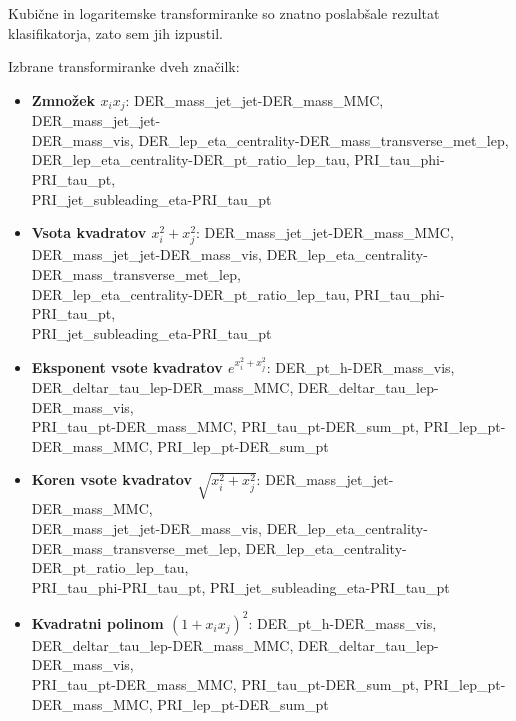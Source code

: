 \documentclass[11pt,a4paper,openany]{book}
\begin{document}
Kubične in logaritemske transformiranke so znatno poslabšale rezultat klasifikatorja, zato sem jih izpustil.

Izbrane transformiranke dveh značilk:
\begin{itemize}
	\item \textbf{Zmnožek $x_ix_j$}: DER\_mass\_jet\_jet-DER\_mass\_MMC, DER\_mass\_jet\_jet- \\ DER\_mass\_vis, DER\_lep\_eta\_centrality-DER\_mass\_transverse\_met\_lep, \\ DER\_lep\_eta\_centrality-DER\_pt\_ratio\_lep\_tau, PRI\_tau\_phi-PRI\_tau\_pt, \\ PRI\_jet\_subleading\_eta-PRI\_tau\_pt
	
	\item \textbf{Vsota kvadratov $x_i^2 + x_j^2$}: DER\_mass\_jet\_jet-DER\_mass\_MMC, DER\_mass\_jet\_jet-DER\_mass\_vis, DER\_lep\_eta\_centrality-DER\_mass\_transverse\_met\_lep, \\
	DER\_lep\_eta\_centrality-DER\_pt\_ratio\_lep\_tau, PRI\_tau\_phi-PRI\_tau\_pt, \\ PRI\_jet\_subleading\_eta-PRI\_tau\_pt
	
	\item \textbf{Eksponent vsote kvadratov $e^{x_i^2 + x_j^2}$}: DER\_pt\_h-DER\_mass\_vis, \\ DER\_deltar\_tau\_lep-DER\_mass\_MMC, DER\_deltar\_tau\_lep-DER\_mass\_vis, \\ PRI\_tau\_pt-DER\_mass\_MMC, PRI\_tau\_pt-DER\_sum\_pt, PRI\_lep\_pt- \\ DER\_mass\_MMC, PRI\_lep\_pt-DER\_sum\_pt
	
	\item \textbf{Koren vsote kvadratov $\sqrt{x_i^2 + x_j^2}$}:  DER\_mass\_jet\_jet-DER\_mass\_MMC, \\ DER\_mass\_jet\_jet-DER\_mass\_vis, DER\_lep\_eta\_centrality- \\ DER\_mass\_transverse\_met\_lep,
	DER\_lep\_eta\_centrality-DER\_pt\_ratio\_lep\_tau, \\ PRI\_tau\_phi-PRI\_tau\_pt, PRI\_jet\_subleading\_eta-PRI\_tau\_pt
	
	\item \textbf{Kvadratni polinom $(1 + x_ix_j)^2$}: DER\_pt\_h-DER\_mass\_vis, \\
	DER\_deltar\_tau\_lep-DER\_mass\_MMC, DER\_deltar\_tau\_lep-DER\_mass\_vis,  \\ PRI\_tau\_pt-DER\_mass\_MMC,
	PRI\_tau\_pt-DER\_sum\_pt, PRI\_lep\_pt- \\ DER\_mass\_MMC, PRI\_lep\_pt-DER\_sum\_pt
	
\end{itemize}
\end{document}
